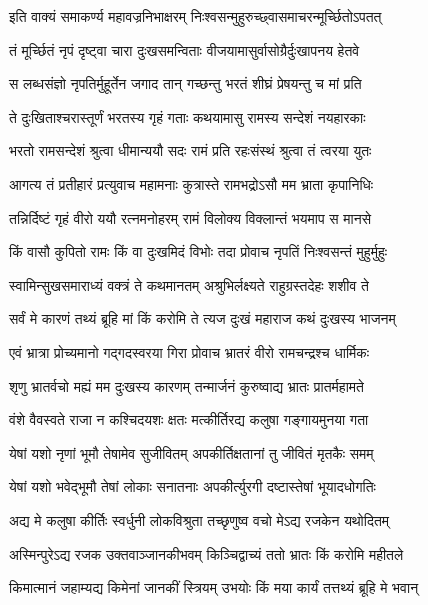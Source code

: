 
\twolineshloka
{इति वाक्यं समाकर्ण्य महावज्रनिभाक्षरम्}
{निःश्वसन्मुहुरुच्छ्वासमाचरन्मूर्च्छितोऽपतत्}%

\twolineshloka
{तं मूर्च्छितं नृपं दृष्ट्वा चारा दुःखसमन्विताः}
{वीजयामासुर्वासोग्रैर्दुःखापनय हेतवे}%

\twolineshloka
{स लब्धसंज्ञो नृपतिर्मुहूर्तेन जगाद तान्}
{गच्छन्तु भरतं शीघ्रं प्रेषयन्तु च मां प्रति}%

\twolineshloka
{ते दुःखिताश्चरास्तूर्णं भरतस्य गृहं गताः}
{कथयामासु रामस्य सन्देशं नयहारकाः}%

\twolineshloka
{भरतो रामसन्देशं श्रुत्वा धीमान्ययौ सदः}
{रामं प्रति रहःसंस्थं श्रुत्वा तं त्वरया युतः}%

\twolineshloka
{आगत्य तं प्रतीहारं प्रत्युवाच महामनाः}
{कुत्रास्ते रामभद्रोऽसौ मम भ्राता कृपानिधिः}%

\twolineshloka
{तन्निर्दिष्टं गृहं वीरो ययौ रत्नमनोहरम्}
{रामं विलोक्य विक्लान्तं भयमाप स मानसे}%

\twolineshloka
{किं वासौ कुपितो रामः किं वा दुःखमिदं विभोः}
{तदा प्रोवाच नृपतिं निःश्वसन्तं मुहुर्मुहुः}%

\twolineshloka
{स्वामिन्सुखसमाराध्यं वक्त्रं ते कथमानतम्}
{अश्रुभिर्लक्ष्यते राहुग्रस्तदेहः शशीव ते}%

\twolineshloka
{सर्वं मे कारणं तथ्यं ब्रूहि मां किं करोमि ते}
{त्यज दुःखं महाराज कथं दुःखस्य भाजनम्}%

\twolineshloka
{एवं भ्रात्रा प्रोच्यमानो गद्गदस्वरया गिरा}
{प्रोवाच भ्रातरं वीरो रामचन्द्रश्च धार्मिकः}%

\twolineshloka
{शृणु भ्रातर्वचो मह्यं मम दुःखस्य कारणम्}
{तन्मार्जनं कुरुष्वाद्य भ्रातः प्रातर्महामते}%

\twolineshloka
{वंशे वैवस्वते राजा न कश्चिदयशः क्षतः}
{मत्कीर्तिरद्य कलुषा गङ्गायमुनया गता}%

\twolineshloka
{येषां यशो नृणां भूमौ तेषामेव सुजीवितम्}
{अपकीर्तिक्षतानां तु जीवितं मृतकैः समम्}%

\twolineshloka
{येषां यशो भवेद्भूमौ तेषां लोकाः सनातनाः}
{अपकीर्त्युरगी दष्टास्तेषां भूयादधोगतिः}%

\twolineshloka
{अद्य मे कलुषा कीर्तिः स्वर्धुनी लोकविश्रुता}
{तच्छृणुष्व वचो मेऽद्य रजकेन यथोदितम्}%

\twolineshloka
{अस्मिन्पुरेऽद्य रजक उक्तवाञ्जानकीभवम्}
{किञ्चिद्वाच्यं ततो भ्रातः किं करोमि महीतले}%

\twolineshloka
{किमात्मानं जहाम्यद्य किमेनां जानकीं स्त्रियम्}
{उभयोः किं मया कार्यं तत्तथ्यं ब्रूहि मे भवान्}%

